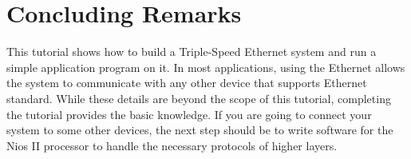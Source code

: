 \documentclass[11pt, twoside, pdftex]{article}
\newcommand{\commonPath}{../../../Common}
\begin{document}
\section{Concluding Remarks}
This tutorial shows how to build a Triple-Speed Ethernet system and run a simple application program on it. In most applications, using the Ethernet allows the system to communicate with any other device that supports Ethernet standard. While these details are beyond the scope of this tutorial, completing the tutorial provides the basic knowledge. If you are going to connect your system to some other devices, the next step should be to write software for the Nios II processor to handle the necessary protocols of higher layers.



\end{document}
